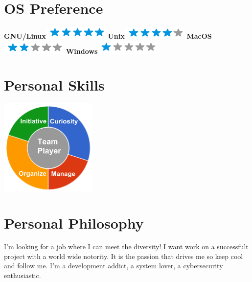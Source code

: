\documentclass[]{friggeri-cv}
\begin{document}
\begin{aside}
    \section{OS Preference}
        \textbf{GNU/Linux}\includegraphics[scale=0.40]{img/5stars.png}
        \textbf{Unix}\includegraphics[scale=0.40]{img/4stars.png}
        \textbf{MacOS}\includegraphics[scale=0.40]{img/2stars.png}
        \textbf{Windows}\includegraphics[scale=0.40]{img/1stars.png}
        ~
    \section{Personal Skills}
        \includegraphics[scale=0.62]{img/personal.png}
        ~
\end{aside}

\section{Personal Philosophy}
    I'm looking for a job where I can meet the diversity! I want work on a successfult project with a world wide notority.
    It is the passion that drives me so keep cool and follow me. I'm a development addict, a system lover, a cybersecurity enthusiastic.
\end{document}
